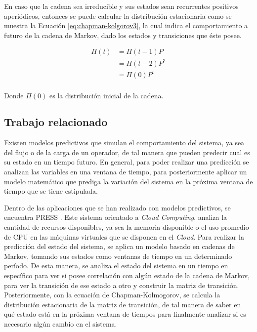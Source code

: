 \normalsize{En caso que la cadena sea irreducible y sus estados sean recurrentes positivos aperiódicos}, entonces se puede calcular la distribución estacionaria como se muestra la Ecuación \ref{eq:chapman-kolgorov3}, la cual indica el comportamiento a futuro de la cadena de Markov, dado los estados y transiciones que éste posee.

\begin{equation} \label{eq:chapman-kolgorov3}
\begin{split}
	\Pi (t) &= \Pi (t-1)P \\
				  &= \Pi (t-2)P^{2}\\
				  &= \Pi (0)P^{t}\\
\end{split}
\end{equation}

\normalsize{Donde $\Pi (0)$ es la distribución inicial de la cadena.}

\subsection{Trabajo relacionado}
\label{subSec:markovTrabajo}
Existen modelos predictivos \normalsize{que} simulan el comportamiento del sistema, ya sea del flujo o de la carga de un operador, de tal manera que pueden predecir cual es su estado en un tiempo futuro. En general, para poder realizar una predicción se analizan las variables en una ventana de tiempo, para posteriormente aplicar un modelo matemático que prediga la variación del sistema en la próxima ventana de tiempo que se tiene estipulada.

Dentro de las aplicaciones que se han realizado con modelos predictivos, se encuentra PRESS \citep{GongGW10}. Este sistema orientado a \textit{Cloud Computing}, analiza la cantidad de recursos disponibles, ya sea la memoria disponible o el uso promedio de CPU en las máquinas virtuales que se disponen en el \textit{Cloud}. Para realizar la predicción del estado del sistema, se aplica un modelo basado en cadenas de Markov, tomando sus estados como ventanas de tiempo en un determinado período. De esta manera, se analiza el estado del sistema en un tiempo en específico para ver si posee correlación con algún estado de la cadena de Markov, para ver la transición de ese estado a otro y construir la matriz de transición. Posteriormente, con la ecuación de Chapman-Kolmogorov, se calcula la distribución estacionaria de la matriz de transición, de tal manera de saber en \normalsize{qué} estado está en la próxima ventana de tiempos para finalmente analizar si es necesario algún cambio en el sistema.

